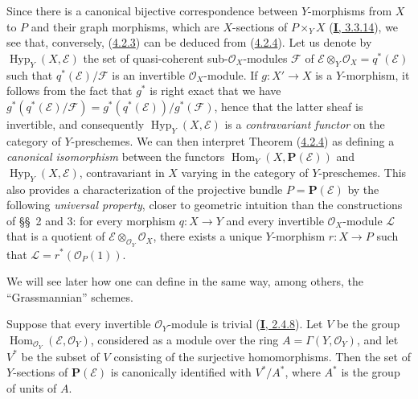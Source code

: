 \begin{remark}[4.2.5]
\label{II.4.2.5}
Since there is a canonical bijective correspondence between $Y$-morphisms from $X$
to $P$ and their graph morphisms, which are $X$-sections of $P\times_YX$
(\hyperref[I.3.3.14]{\textbf{I}, 3.3.14}), we see that, conversely,
(\hyperref[II.4.2.3]{4.2.3}) can be deduced from
(\hyperref[II.4.2.4]{4.2.4}). Let us denote by
$\operatorname{Hyp}_Y(X,\mathcal{E})$ the set of quasi-coherent
sub-$\mathcal{O}_X$-modules $\mathcal{F}$ of
$\mathcal{E}\otimes_Y\mathcal{O}_X=q^*(\mathcal{E})$ such that
$q^*(\mathcal{E})/\mathcal{F}$ is an invertible $\mathcal{O}_X$-module. If
$g:X'\to X$ is a $Y$-morphism, it follows from the fact that $g^*$ is right
exact that we have $g^*(q^*(\mathcal{E})/\mathcal{F})=g^*(q^*(\mathcal{E}))/g^*(\mathcal{F})$,
hence that the latter sheaf is invertible, and consequently
$\operatorname{Hyp}_Y(X,\mathcal{E})$ is a \emph{contravariant functor} on the
category of $Y$-preschemes. We can then interpret Theorem
(\hyperref[II.4.2.4]{4.2.4}) as defining a \emph{canonical isomorphism}
between the functors $\operatorname{Hom}_Y(X,\mathbf{P}(\mathcal{E}))$ and
$\operatorname{Hyp}_Y(X,\mathcal{E})$, contravariant in $X$ varying in the
category of $Y$-preschemes. This also provides a characterization of the
projective bundle $P=\mathbf{P}(\mathcal{E})$ by the following \emph{universal property},
closer to geometric intuition than the constructions of \S\S~2 and
3: for every morphism $q:X\to Y$ and every invertible $\mathcal{O}_X$-module
$\mathcal{L}$ that is a quotient of $\mathcal{E}\otimes_{\mathcal{O}_Y}\mathcal{O}_X$,
there exists a unique $Y$-morphism $r:X\to P$ such that
$\mathcal{L}=r^*(\mathcal{O}_P(1))$.

We will see later how one can define in the same way, among others,
the ``Grassmannian'' schemes.
\end{remark}

\begin{corollary}[4.2.6]
\label{II.4.2.6}
Suppose that every invertible $\mathcal{O}_Y$-module is trivial
\textup{(\hyperref[I.2.4.8]{\textbf{I}, 2.4.8})}. Let $V$ be the group
$\operatorname{Hom}_{\mathcal{O}_Y}(\mathcal{E},\mathcal{O}_Y)$, considered
as a module over the ring $A=\Gamma(Y,\mathcal{O}_Y)$, and let $V^*$ be the
subset of $V$ consisting of the surjective homomorphisms. Then the set
of $Y$-sections of $\mathbf{P}(\mathcal{E})$ is canonically identified with
$V^*/A^*$, where $A^*$ is the group of units of $A$.
\end{corollary}

